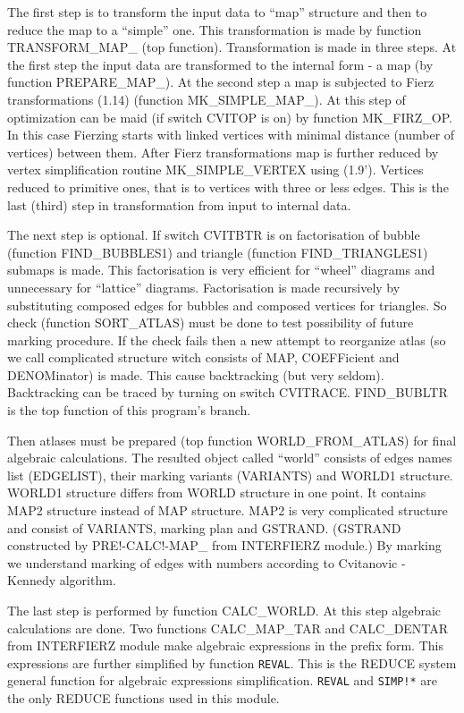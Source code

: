The first step is to transform the input data to ``map'' structure and
then to reduce the map to a ``simple'' one. This transformation is made
by function TRANSFORM\_MAP\_ (top function). Transformation is made in
three steps. At the first step the input data are transformed to the
internal form - a map (by function PREPARE\_MAP\_). At the second step
a map is subjected to Fierz transformations (1.14) (function
MK\_SIMPLE\_MAP\_). At this step of optimization can be maid (if
switch CVITOP is on) by function MK\_FIRZ\_OP.  In this case Fierzing
starts with linked vertices with minimal distance (number of vertices)
between them.  After Fierz transformations map is further reduced by
vertex simplification routine MK\_SIMPLE\_VERTEX using (1.9').
Vertices reduced to primitive ones, that is to vertices with three or
less edges.  This is the last (third) step in transformation from
input to internal data.

The next step is optional.  If switch CVITBTR is on factorisation of
bubble (function FIND\_BUBBLES1) and triangle (function
FIND\_TRIANGLES1) submaps is made.  This factorisation is very
efficient for ``wheel'' diagrams and unnecessary for ``lattice'' diagrams.
Factorisation is made recursively by substituting composed edges for
bubbles and composed vertices for triangles.  So check (function
SORT\_ATLAS) must be done to test possibility of future marking
procedure.  If the check fails then a new attempt to reorganize atlas
(so we call complicated structure witch consists of MAP, COEFFicient
and DENOMinator) is made. This cause backtracking (but very seldom).
Backtracking can be traced by turning on switch CVITRACE. FIND\_BUBLTR
is the top function of this program's branch.

Then atlases must be prepared (top function WORLD\_FROM\_ATLAS) for
final algebraic calculations.  The resulted object called ``world''
consists of edges names list (EDGELIST), their marking variants
(VARIANTS) and WORLD1 structure. WORLD1 structure differs from WORLD
structure in one point.  It contains MAP2 structure instead of MAP
structure. MAP2 is very complicated structure and consist of VARIANTS,
marking plan and GSTRAND.  (GSTRAND constructed by PRE!-CALC!-MAP\_
from INTERFIERZ module.)  By marking we understand marking of edges
with numbers according to Cvitanovic - Kennedy algorithm.

The last step is performed by function CALC\_WORLD. At this step
algebraic calculations are done.  Two functions CALC\_MAP\_TAR and
CALC\_DENTAR from INTERFIERZ module make algebraic expressions in the
prefix form. This expressions are further simplified by function
{\tt REVAL}.  This is the REDUCE system general function for algebraic
expressions simplification. {\tt REVAL} and {\tt SIMP!*} are the only REDUCE
functions used in this module.

